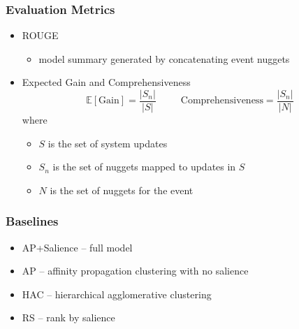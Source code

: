 \begin{frame}
    \frametitle{Evaluation Metrics}
    \begin{itemize}
        \pause
        \item ROUGE 
        \pause
        \begin{itemize}
            \item model summary generated by concatenating event nuggets
        \end{itemize}
        \pause
    \item Expected Gain and Comprehensiveness
        $$\mathbb{E}[\mathrm{Gain}] = \frac{|S_n|}{|S|}\;\;\;\;\;\;\;\;\;
            \textrm{Comprehensiveness} = \frac{|S_n|}{|N|}$$
            where \begin{itemize}
                    \pause
            \item[] $S$ is the set of system updates
                    \pause
                \item[] $S_n$ is the set of nuggets mapped to updates in $S$
                    \pause
                \item[] $N$ is the set of nuggets for the event
            \end{itemize}
    \end{itemize}
\end{frame}

\begin{frame}
    \frametitle{Baselines}
    \begin{itemize}
    \item AP+Salience -- full model
    \item AP -- affinity propagation clustering with no salience
    \item HAC -- hierarchical agglomerative clustering
    \item RS -- rank by salience
    \end{itemize}
\end{frame}

